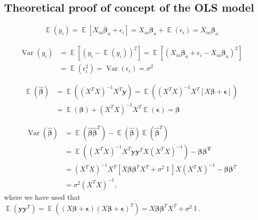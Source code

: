 \documentclass[twocolumn,english,notitlepage]{article}
\renewcommand{\vec}[1]{\boldsymbol{#1}}
\newcommand{\pclosed}[1]{\left(#1\right)}
\newcommand{\bclosed}[1]{\left[#1\right]}
\renewcommand{\expval}{\operatorname{\mathbb{E}}}
\renewcommand{\var}{\operatorname{Var}}
\DeclareMathOperator{\eye}{\mathbb{I}}
\newcommand{\betahat}{\hat{\beta}}
\begin{document}
\begin{appendices}
    \section{Theoretical proof of concept of the OLS model}
        \begin{align}
            \expval(y_i) = \expval\bclosed{X_{ia} \vec{\beta}_a + \epsilon_i} = X_{ia}\vec{\beta}_a + \expval(\epsilon_i) = X_{ia}\vec{\beta}_a
        \end{align}

        \begin{align} \nonumber
            \var(y_i) &= \expval\bclosed{\pclosed{y_i-\expval\pclosed{y_i}}^2} = \expval\bclosed{\pclosed{X_{ia}\vec{\beta}_a + \epsilon_i - X_{ia}\vec{\beta}_a}^2} \\
            &= \expval\pclosed{\epsilon_i^2} = \var\pclosed{\epsilon_i} = \sigma^2
        \end{align}

        \begin{align} \nonumber
            \expval(\vec{\betahat}) &= \expval\pclosed{(X^TX)^{-1}X^T \vec{y}} = \expval\pclosed{(X^TX)^{-1}X^T \bclosed{X\vec{\beta} + \vec{\epsilon}} } \\
            &= \expval\pclosed{\vec{\beta}} + {(X^TX)}^{-1}X^T \expval\pclosed{\vec{\epsilon}} = \vec{\beta}
        \end{align}

        \begin{align} \nonumber
            \var(\vec{\betahat}) &= \expval({\vec{\betahat} \vec{\betahat}^T}) - \expval({\vec{\betahat}}) \expval({\vec{\betahat}^T}) \\ \nonumber
            &= \expval((X^TX)^{-1}X^T \vec{y} \vec{y}^T X (X^TX)^{-1}) - \vec{\beta}\vec{\beta^T} \\ \nonumber
            &= (X^TX)^{-1}X^T \bclosed{X\vec{\beta}\vec{\beta}^TX^T + \sigma^2 \eye}X (X^TX)^{-1} - \vec{\beta}\vec{\beta}^T \\
            &= \sigma^2 (X^TX)^{-1},
        \end{align}
        where we have used that \(\expval(\vec{y}\vec{y}^T) = \expval\pclosed{(X\vec{\beta}+\vec{\epsilon})(X\vec{\beta}+\vec{\epsilon})^T} = X\vec{\beta}\vec{\beta}^TX^T + \sigma^2 \eye\).


\end{appendices}
\end{document}
